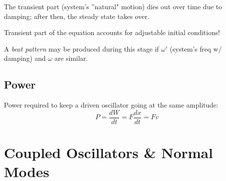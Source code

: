 \documentclass[11pt,letterpaper,titlepage,oneside]{book}
\begin{document}
The transient part (system's ''natural" motion) dies out over time due to damping; after then, the steady state takes over. 

Transient part of the equation accounts for adjustable initial conditions!

A \emph{beat pattern} may be produced during this stage if $\omega'$ (system's freq w/ damping) and $\omega$ are similar.

\section{Power}
Power required to keep a driven oscillator going at the same amplitude:
\[ P = \frac{dW}{dt} = F\frac{dx}{dt} = Fv \]

\chapter{Coupled Oscillators \& Normal Modes}
\end{document}
